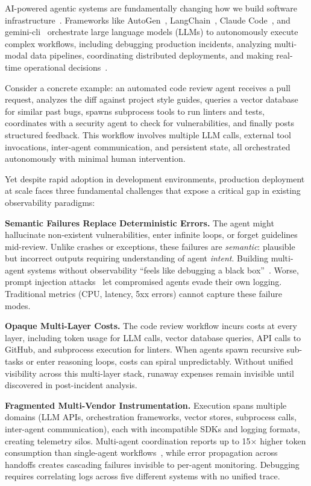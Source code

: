 \documentclass[sigplan,screen,9pt]{acmart}
\begin{document}
AI-powered agentic systems are fundamentally changing how we build software infrastructure~\cite{wang2024survey,guo2024survey}. Frameworks like AutoGen~\cite{autogen}, LangChain~\cite{langchain}, Claude Code~\cite{claudecode}, and gemini-cli~\cite{geminicli} orchestrate large language models (LLMs) to autonomously execute complex workflows, including debugging production incidents, analyzing multi-modal data pipelines, coordinating distributed deployments, and making real-time operational decisions~\cite{tran2025survey}.

Consider a concrete example: an automated code review agent receives a pull request, analyzes the diff against project style guides, queries a vector database for similar past bugs, spawns subprocess tools to run linters and tests, coordinates with a security agent to check for vulnerabilities, and finally posts structured feedback. This workflow involves multiple LLM calls, external tool invocations, inter-agent communication, and persistent state, all orchestrated autonomously with minimal human intervention.

Yet despite rapid adoption in development environments, production deployment at scale faces three fundamental challenges that expose a critical gap in existing observability paradigms:

\textbf{Semantic Failures Replace Deterministic Errors.} The agent might hallucinate non-existent vulnerabilities, enter infinite loops, or forget guidelines mid-review. Unlike crashes or exceptions, these failures are \emph{semantic}: plausible but incorrect outputs requiring understanding of agent \emph{intent}. Building multi-agent systems without observability ``feels like debugging a black box''~\cite{petropavlov-medium,masood-medium}. Worse, prompt injection attacks~\cite{indirect-prompt-inject} let compromised agents evade their own logging. Traditional metrics (CPU, latency, 5xx errors) cannot capture these failure modes.

\textbf{Opaque Multi-Layer Costs.} The code review workflow incurs costs at every layer, including token usage for LLM calls, vector database queries, API calls to GitHub, and subprocess execution for linters. When agents spawn recursive sub-tasks or enter reasoning loops, costs can spiral unpredictably. Without unified visibility across this multi-layer stack, runaway expenses remain invisible until discovered in post-incident analysis.

\textbf{Fragmented Multi-Vendor Instrumentation.} Execution spans multiple domains (LLM APIs, orchestration frameworks, vector stores, subprocess calls, inter-agent communication), each with incompatible SDKs and logging formats, creating telemetry silos. Multi-agent coordination reports up to 15× higher token consumption than single-agent workflows~\cite{anthropic-multiagent}, while error propagation across handoffs creates cascading failures invisible to per-agent monitoring. Debugging requires correlating logs across five different systems with no unified trace.
\end{document}
